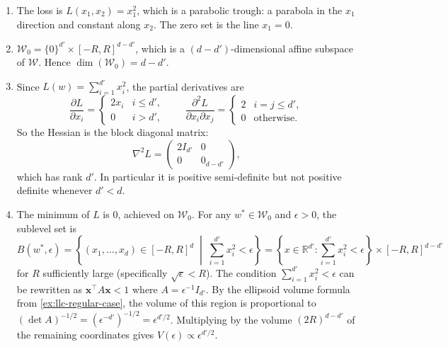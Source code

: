 \documentclass[11pt]{article}
\newcommand{\R}{\mathbb{R}}
\newcommand{\W}{\mathcal{W}}
\begin{document}
\begin{solution}
\begin{enumerate}
    \item The loss is $L(x_1, x_2) = x_1^2$, which is a parabolic trough: a parabola in the $x_1$ direction and constant along $x_2$. The zero set is the line $x_1 = 0$.
    \item $\W_0 = \{0\}^{d'} \times [-R,R]^{d-d'}$, which is a $(d - d')$-dimensional affine subspace of $\W$. Hence $\dim(\W_0) = d - d'$.
    \item Since $L(w) = \sum_{i=1}^{d'} x_i^2$, the partial derivatives are
    \[
        \frac{\partial L}{\partial x_i} = \begin{cases} 2x_i & i \leq d', \\ 0 & i > d', \end{cases}
        \qquad
        \frac{\partial^2 L}{\partial x_i \partial x_j} = \begin{cases} 2 & i = j \leq d', \\ 0 & \text{otherwise}. \end{cases}
    \]
    So the Hessian is the block diagonal matrix:
    \[
        \nabla^2 L = \begin{pmatrix} 2I_{d'} & 0 \\ 0 & 0_{d-d'} \end{pmatrix},
    \]
    which has rank $d'$. In particular it is positive semi-definite but not positive definite whenever $d' < d$.
    \item The minimum of $L$ is $0$, achieved on $\W_0$. For any $w^* \in \W_0$ and $\epsilon > 0$, the sublevel set is
    \[
        B(w^*, \epsilon) = \left\{ (x_1,\dots,x_d) \in [-R,R]^d \;\middle|\; \sum_{i=1}^{d'} x_i^2 < \epsilon \right\} = \left\{x \in \R^{d'} : \sum_{i=1}^{d'} x_i^2 < \epsilon \right\} \times [-R,R]^{d-d'}
    \]
    for $R$ sufficiently large (specifically $\sqrt{\epsilon} < R$). The condition $\sum_{i=1}^{d'} x_i^2 < \epsilon$ can be rewritten as $\mathbf{x}^\top A \mathbf{x} < 1$ where $A = \epsilon^{-1} I_{d'}$. By the ellipsoid volume formula from \cref{ex:llc-regular-case}, the volume of this region is proportional to $(\det A)^{-1/2} = (\epsilon^{-d'})^{-1/2} = \epsilon^{d'/2}$. Multiplying by the volume $(2R)^{d-d'}$ of the remaining coordinates gives $V(\epsilon) \propto \epsilon^{d'/2}$. \qedhere
\end{enumerate}
\end{solution}
\end{document}
